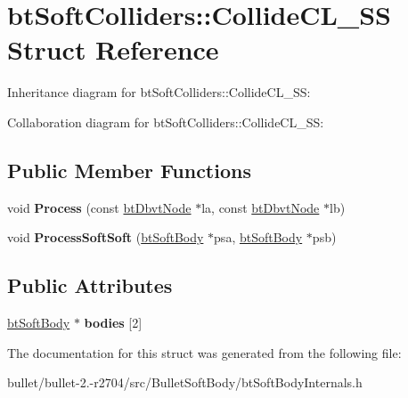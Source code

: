 \hypertarget{structbt_soft_colliders_1_1_collide_c_l___s_s}{\section{bt\+Soft\+Colliders\+:\+:Collide\+C\+L\+\_\+\+S\+S Struct Reference}
\label{structbt_soft_colliders_1_1_collide_c_l___s_s}
}


Inheritance diagram for bt\+Soft\+Colliders\+:\+:Collide\+C\+L\+\_\+\+S\+S\+:


Collaboration diagram for bt\+Soft\+Colliders\+:\+:Collide\+C\+L\+\_\+\+S\+S\+:
\subsection*{Public Member Functions}
\begin{DoxyCompactItemize}
\item 
\hypertarget{structbt_soft_colliders_1_1_collide_c_l___s_s_a1d8e929afd1afec1b606cce34c4a9a32}{void {\bfseries Process} (const \hyperlink{structbt_dbvt_node}{bt\+Dbvt\+Node} $\ast$la, const \hyperlink{structbt_dbvt_node}{bt\+Dbvt\+Node} $\ast$lb)}\label{structbt_soft_colliders_1_1_collide_c_l___s_s_a1d8e929afd1afec1b606cce34c4a9a32}

\item 
\hypertarget{structbt_soft_colliders_1_1_collide_c_l___s_s_add30e370fb0aee3ccb58c4ef6758a5fc}{void {\bfseries Process\+Soft\+Soft} (\hyperlink{classbt_soft_body}{bt\+Soft\+Body} $\ast$psa, \hyperlink{classbt_soft_body}{bt\+Soft\+Body} $\ast$psb)}\label{structbt_soft_colliders_1_1_collide_c_l___s_s_add30e370fb0aee3ccb58c4ef6758a5fc}

\end{DoxyCompactItemize}
\subsection*{Public Attributes}
\begin{DoxyCompactItemize}
\item 
\hypertarget{structbt_soft_colliders_1_1_collide_c_l___s_s_a5f72549e519b6274255f78bf00b62dec}{\hyperlink{classbt_soft_body}{bt\+Soft\+Body} $\ast$ {\bfseries bodies} \mbox{[}2\mbox{]}}\label{structbt_soft_colliders_1_1_collide_c_l___s_s_a5f72549e519b6274255f78bf00b62dec}

\end{DoxyCompactItemize}


The documentation for this struct was generated from the following file\+:\begin{DoxyCompactItemize}
\item 
bullet/bullet-\/2.-\/r2704/src/\+Bullet\+Soft\+Body/bt\+Soft\+Body\+Internals.\+h\end{DoxyCompactItemize}
